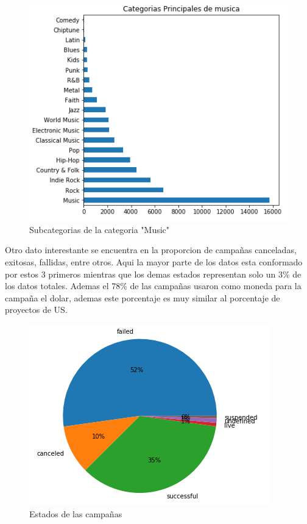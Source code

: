 \documentclass[journal]{IEEEtran}
\begin{document}
\begin{figure}[H]
    \centering
    \captionsetup{justification=centering}
\includegraphics[width=\linewidth]{Images/CategoriasMusic.PNG}
    \caption{Subcategorias de la categoria "Music"}
\end{figure}

Otro dato interestante se encuentra en la proporcion de campañas canceladas, exitosas, fallidas, entre otros. Aqui la mayor parte de los datos esta conformado por estos 3 primeros mientras que los demas estados representan solo un 3\% de los datos totales. Ademas el 78\% de las campañas usaron como moneda para la campaña el dolar, ademas este porcentaje es muy similar al porcentaje de proyectos de US.

\begin{figure}[H]
    \centering
    \captionsetup{justification=centering}
\includegraphics[width=\linewidth]{Images/states.png}
    \caption{Estados de las campañas}
\end{figure}
\end{document}
